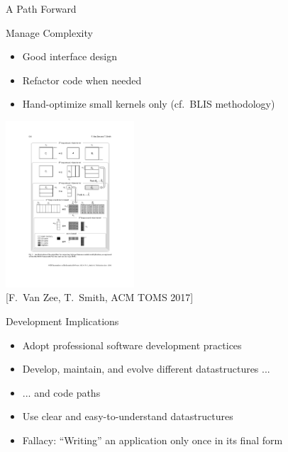 



\begin{frame}{A Path Forward}
 
 \begin{block}{Manage Complexity}
  \begin{itemize}
   \item Good interface design
   \item Refactor code when needed
   \item Hand-optimize small kernels only (cf.~BLIS methodology)
  \end{itemize}
 \end{block}
 
 \vspace*{-3.2cm}
 \begin{flushright}
  \includegraphics[width=0.36\textwidth]{figures/BLISLoops} \\
  {\scriptsize [F.~Van Zee, T.~Smith, ACM TOMS 2017]}
 \end{flushright}

 \vspace*{-4.5cm}
 \begin{block}{Development Implications}
  \begin{itemize}
   \item Adopt professional software development practices %
   \item Develop, maintain, and evolve different datastructures ...
   \item ... and code paths
   \item Use clear and easy-to-understand datastructures
   \item Fallacy: ``Writing'' an application only once in its final form %
  \end{itemize}
 \end{block}
 
\end{frame}



